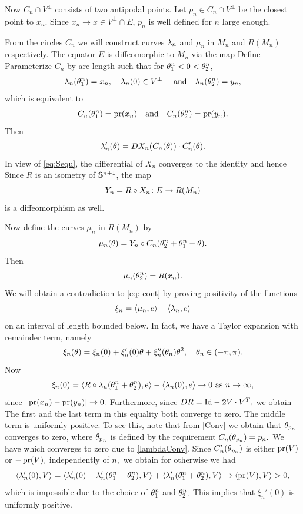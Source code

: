 \documentclass{amsart}
\begin{document}
{Now $C_n \cap V^{\perp}$ consists of two antipodal points. Let $p_n \in C_n \cap V^{\perp}$ be the closest point to $x_n$. Since $x_n \to x \in V^{\perp} \cap E$, $p_n$ is well defined for $n$ large enough.

From the circles $C_n$ we will construct curves $\l_n$ and $\mu_n$ in $M_n$ and $R(M_n)$ respectively. The equator $E$ is diffeomorphic to $M_n$ via the map
Define
Parameterize $C_n$ by arc length such that for $\t_1^n<0<\t_2^n$,
\[\l_n(\t_1^n)=x_n,\quad \l_n(0)\in V^{\perp}\quad~\text{and}\quad \l_n(\t_2^n)=y_n,\]
which is equivalent to
\[C_n(\t^n_1)=\pr(x_n)\quad\text{and}\quad C_n(\t^n_2)=\pr(y_n).\]
Then
\[\l_n'(\t)=DX_n(C_n(\t))\cdot C_n'(\t).\]
In view of \eqref{eq:Sequ}, the differential of $X_n$ converges to the identity and hence
Since $R$ is an isometry of $\S^{n+1}$, the map
\[Y_n=R\circ X_n\cn E\ra R(M_n)\]
is a diffeomorphism as well.

Now define the curves $\mu_n$ in $R(M_n)$ by
\[\mu_n(\t)=Y_n\circ C_n(\t^n_2+\t^n_1-\t).\]
Then
\[\mu_n(\t^n_2)=R(x_n).\]
We will obtain a contradiction to \eqref{eq: cont} by proving positivity of the functions
\[\xi_n=\inpr{\mu_n}{e}-\inpr{\l_n}{e}\]
on an interval of length bounded below.
In fact, we have a Taylor expansion with remainder term, namely
\[\xi_n(\t)=\xi_n(0)+\xi_n'(0)\t+\xi_n''(\t_n)\t^2,\quad \t_n\in (-\pi,\pi).\]
Now
\[\xi_n(0)=\inpr{R\circ\l_n(\t^n_1+\t^n_2)}{e}-\inpr{\l_n(0)}{e}\ra 0~\text{as}~ n\ra\8,\]
since $|\pr(x_n)-\pr(y_n)|\ra 0.$
Furthermore, since $DR=\mrm{Id}-2V\cdot V^{T},$ we obtain
 The first and the last term in this equality both converge to zero. The middle term is uniformly positive. To see this, note that
 from \eqref{Conv} we obtain that $\t_{p_n}$ converges to zero, where $\t_{p_n}$ is defined by the requirement $C_n(\t_{p_n})=p_n.$ We have
which converges to zero due to \eqref{lambdaConv}. Since $C_n'(\t_{p_n})$ is either $\pr(V)$ or $-\pr(V),$ independently of $n,$ we obtain
for otherwise we had
$$\inpr{\l_n'(0)}{V}=\inpr{\l_n'(0)-\l_n'(\t^n_1+\t^n_2)}{V}+\inpr{\l_n'(\t^n_1+\t^n_2)}{V}\ra \inpr{\pr(V)}{V}>0,$$
which is impossible due to the choice of $\t^n_1$ and $\t^n_2.$ This implies that $\xi_n'(0)$ is uniformly positive.

}
\end{document}
